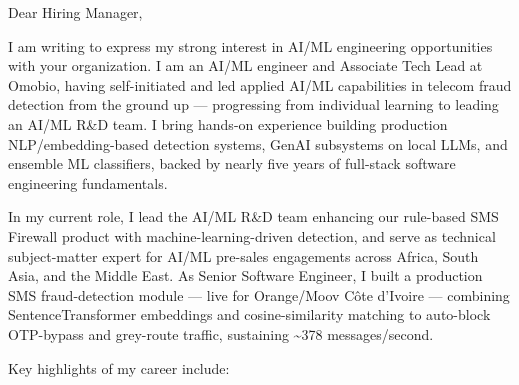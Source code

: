 \documentclass[11pt]{article}
\begin{document}

Dear Hiring Manager,

I am writing to express my strong interest in AI/ML engineering opportunities with your organization. I am an AI/ML engineer and Associate Tech Lead at Omobio, having self-initiated and led applied AI/ML capabilities in telecom fraud detection from the ground up --- progressing from individual learning to leading an AI/ML R\&D team. I bring hands-on experience building production NLP/embedding-based detection systems, GenAI subsystems on local LLMs, and ensemble ML classifiers, backed by nearly five years of full-stack software engineering fundamentals.

In my current role, I lead the AI/ML R\&D team enhancing our rule-based SMS Firewall product with machine-learning-driven detection, and serve as technical subject-matter expert for AI/ML pre-sales engagements across Africa, South Asia, and the Middle East. As Senior Software Engineer, I built a production SMS fraud-detection module --- live for Orange/Moov C\^ote d'Ivoire --- combining SentenceTransformer embeddings and cosine-similarity matching to auto-block OTP-bypass and grey-route traffic, sustaining \textasciitilde378 messages/second.

Key highlights of my career include:

\begin{clitems}
  \item {}
  \item {}
  \item {}
  \item {}
\end{clitems}
\end{document}
